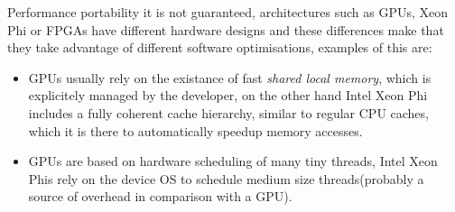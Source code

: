 \par{Performance portability it is not guaranteed, architectures such as GPUs, Xeon Phi or FPGAs have different
    hardware designs and these differences make that they take advantage of different software optimisations\cite{opencl_phi},
    examples of this are:}

\begin{itemize}
    \item GPUs usually rely on the existance of fast \emph{shared local memory}, which is explicitely managed by the developer, on
        the other hand Intel Xeon Phi includes a fully coherent cache hierarchy, similar to regular CPU caches, which it is there
        to automatically speedup memory accesses\cite{opencl_phi}.

    \item GPUs are based on hardware scheduling of many tiny threads, Intel Xeon Phis rely on the device OS to schedule medium size
        threads(probably a source of overhead in comparison with a GPU)\cite{opencl_phi}.
\end{itemize}

